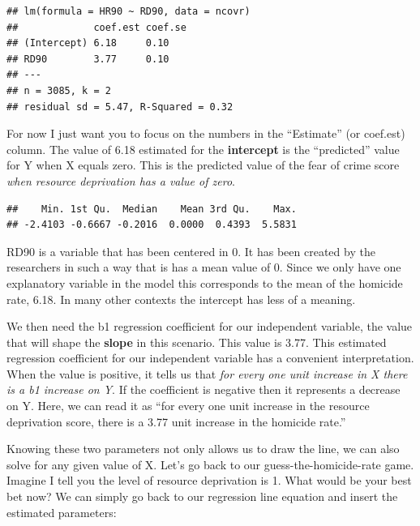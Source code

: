 \documentclass[]{book}
\newenvironment{Shaded}{\begin{snugshade}}{\end{snugshade}}
\newcommand{\KeywordTok}[1]{\textcolor[rgb]{0.13,0.29,0.53}{\textbf{#1}}}
\newcommand{\NormalTok}[1]{#1}
\newcommand{\OperatorTok}[1]{\textcolor[rgb]{0.81,0.36,0.00}{\textbf{#1}}}
\begin{document}
\begin{verbatim}
## lm(formula = HR90 ~ RD90, data = ncovr)
##             coef.est coef.se
## (Intercept) 6.18     0.10   
## RD90        3.77     0.10   
## ---
## n = 3085, k = 2
## residual sd = 5.47, R-Squared = 0.32
\end{verbatim}

For now I just want you to focus on the numbers in the ``Estimate'' (or coef.est) column. The value of 6.18 estimated for the \textbf{intercept} is the ``predicted'' value for Y when X equals zero. This is the predicted value of the fear of crime score \emph{when resource deprivation has a value of zero}.

\begin{Shaded}
\end{Shaded}

\begin{verbatim}
##    Min. 1st Qu.  Median    Mean 3rd Qu.    Max. 
## -2.4103 -0.6667 -0.2016  0.0000  0.4393  5.5831
\end{verbatim}

RD90 is a variable that has been centered in 0. It has been created by the researchers in such a way that is has a mean value of 0. Since we only have one explanatory variable in the model this corresponds to the mean of the homicide rate, 6.18. In many other contexts the intercept has less of a meaning.

We then need the b1 regression coefficient for our independent variable, the value that will shape the \textbf{slope} in this scenario. This value is 3.77. This estimated regression coefficient for our independent variable has a convenient interpretation. When the value is positive, it tells us that \emph{for every one unit increase in X there is a b1 increase on Y}. If the coefficient is negative then it represents a decrease on Y. Here, we can read it as ``for every one unit increase in the resource deprivation score, there is a 3.77 unit increase in the homicide rate.''

Knowing these two parameters not only allows us to draw the line, we can also solve for any given value of X. Let's go back to our guess-the-homicide-rate game. Imagine I tell you the level of resource deprivation is 1. What would be your best bet now? We can simply go back to our regression line equation and insert the estimated parameters:
\end{document}

